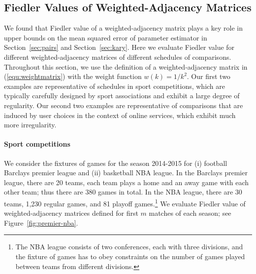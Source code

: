 \subsection{Fiedler Values of Weighted-Adjacency Matrices}

We found that Fiedler value of a weighted-adjacency matrix plays a key role in upper bounds on the mean squared error of parameter estimator in Section~\ref{sec:pairs} and Section~\ref{sec:kary}. Here we evaluate Fiedler value for different weighted-adjacency matrices of different schedules of comparisons. Throughout this section, we use the definition of a weighted-adjacency matrix in (\ref{equ:weightmatrix}) with the weight function $w(k) = 1/k^2$. Our first two examples are representative of schedules in sport competitions, which are typically carefully designed by sport associations and exhibit a large degree of regularity. Our second two examples are representative of comparisons that are induced by user choices in the context of online services, which exhibit much more irregularity. 

\paragraph{Sport competitions} We consider the fixtures of games for the season 2014-2015 for (i) football Barclays premier league and (ii) basketball NBA league. In the Barclays premier league, there are 20 teams, each team plays a home and an away game with each other team; thus there are 380 games in total. In the NBA league, there are 30 teams, 1,230 regular games, and 81 playoff games.\footnote{The NBA league consists of two conferences, each with three divisions, and the fixture of games has to obey constraints on the number of games played between teams from different divisions.} We evaluate Fiedler value of weighted-adjacency matrices defined for first $m$ matches of each season; see Figure~\ref{fig:premier-nba}.


